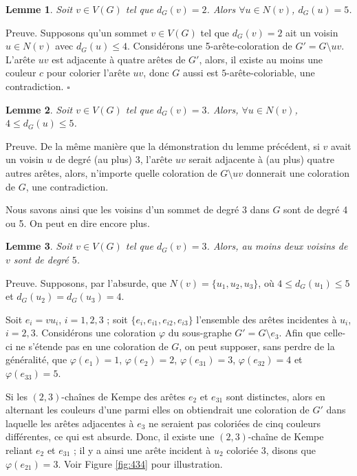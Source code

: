 \documentclass[10pt,a4paper]{article}
\newtheorem{lemme}{Lemme}
\newcommand{\ep}{{\hfill $\square$}}
\begin{document}
\begin{lemme}
Soit $v \in V(G)$ tel que $d_G(v) = 2$. Alors $\forall u \in N(v)$, $d_G(u) = 5$.
\label{le:2}
\end{lemme}

Preuve.
Supposons qu'un sommet $v \in V(G)$ tel que $d_G(v) = 2$ ait un voisin $u \in N(v)$ avec $d_G(u)  \le 4$. Considérons une 5-arête-coloration de $G' = G \setminus uv$.
L'arête $uv$ est adjacente à quatre arêtes de $G'$, alors, il existe au moins une couleur $c$ pour colorier l'arête $uv$, donc $G$ aussi est $5$-arête-coloriable,  une contradiction.
\ep


\begin{lemme}
Soit $v\in V(G)$ tel que $d_G(v) = 3$. Alors, $\forall u \in N(v)$, $4\le d_G(u) \le 5$.
\label{le:33}
\end{lemme}

Preuve. De la même manière que la démonstration du lemme précédent, si $v$ avait un voisin $u$ de degré (au plus) 3, l'arête $uv$ serait adjacente à (au plus) quatre autres arêtes, alors, n'importe quelle coloration de $G\setminus uv$ donnerait une coloration de $G$, une contradiction.

Nous savons ainsi que les voisins d'un sommet de degré 3 dans $G$ sont de degré 4 ou 5. On peut en dire encore plus.

\begin{lemme}
Soit $v\in V(G)$ tel que $d_G(v) = 3$. Alors, au moins deux voisins de $v$ sont de degré $5$.
\label{le:434}
\end{lemme}

Preuve.
Supposons, par l'absurde, que $N(v)=\{u_1,u_2,u_3\}$, où $4\le d_G(u_1) \le 5$ et  $d_G(u_2) = d_G(u_3) = 4$. 

Soit $e_i=vu_i$, $i=1,2,3$ ; soit $\{e_i,e_{i1},e_{i2},e_{i3}\}$ l'ensemble des arêtes incidentes à $u_i$, $i=2,3$. 
Considérons une coloration $\varphi$ du sous-graphe $G' = G \setminus e_3$. Afin que celle-ci ne s'étende pas en une coloration de $G$, on peut supposer, sans perdre de la généralité, que $\varphi(e_1) = 1$, $\varphi(e_2) = 2$, $\varphi(e_{31}) = 3$, $\varphi(e_{32}) = 4$ et $\varphi(e_{33}) = 5$.

Si les $(2,3)$-chaînes de Kempe des arêtes $e_2$ et $e_{31}$ sont distinctes, alors en alternant les couleurs d'une parmi elles on obtiendrait une coloration de $G'$ dans laquelle les arêtes adjacentes à $e_3$ ne seraient pas coloriées de cinq couleurs différentes, ce qui est absurde.
Donc, il existe une $(2,3)$-chaîne de Kempe reliant $e_2$ et $e_{31}$ ; il y a ainsi une arête incident à $u_2$ coloriée 3, disons que $\varphi(e_{21})=3$. Voir Figure \ref{fig:434} pour illustration.
\end{document}
